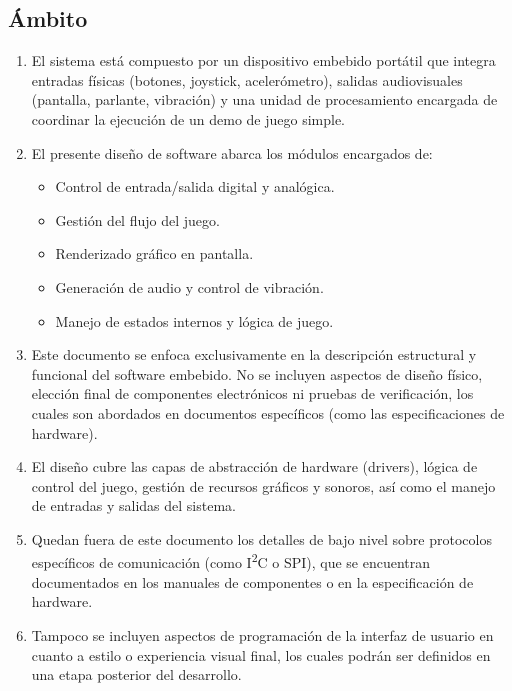 \documentclass[11pt,a4paper]{article}
\begin{document}
\subsection{Ámbito}
\begin{enumerate}
  \item El sistema está compuesto por un dispositivo embebido portátil que integra entradas físicas (botones, joystick, acelerómetro), salidas audiovisuales (pantalla, parlante, vibración) y una unidad de procesamiento encargada de coordinar la ejecución de un demo de juego simple.
  \item El presente diseño de software abarca los módulos encargados de:
  \begin{itemize}
    \item Control de entrada/salida digital y analógica.
    \item Gestión del flujo del juego.
    \item Renderizado gráfico en pantalla.
    \item Generación de audio y control de vibración.
    \item Manejo de estados internos y lógica de juego.
  \end{itemize}
  \item Este documento se enfoca exclusivamente en la descripción estructural y funcional del software embebido. No se incluyen aspectos de diseño físico, elección final de componentes electrónicos ni pruebas de verificación, los cuales son abordados en documentos específicos (como las especificaciones de hardware).
  \item El diseño cubre las capas de abstracción de hardware (drivers), lógica de control del juego, gestión de recursos gráficos y sonoros, así como el manejo de entradas y salidas del sistema. 
  \item Quedan fuera de este documento los detalles de bajo nivel sobre protocolos específicos de comunicación (como I\textsuperscript{2}C o SPI), que se encuentran documentados en los manuales de componentes o en la especificación de hardware.
  \item Tampoco se incluyen aspectos de programación de la interfaz de usuario en cuanto a estilo o experiencia visual final, los cuales podrán ser definidos en una etapa posterior del desarrollo.
\end{enumerate}
\end{document}
